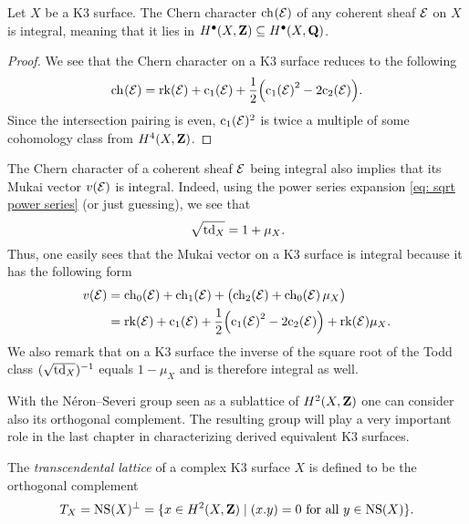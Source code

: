 \begin{corollary}
    Let $X$ be a K3 surface. The Chern character $\ch[](\E)$ of any coherent sheaf $\mathcal E$ on $X$ is integral, meaning that it lies in $H^{\bullet}(X, \mathbf Z) \subseteq H^{\bullet}(X, \mathbf Q)$.
\end{corollary}

\begin{proof}
    We see that the Chern character on a K3 surface reduces to the following
    \[
        \ch[]{\E} = \rk{\E} + \cclass[1]{\E} + \frac{1}{2}\Bigl(\cclass[1]{\E}^2 - 2\cclass[2]{\E}\Bigr).
    \]
    Since the intersection pairing is even, $\cclass[1](\E)^2$ is twice a multiple of some cohomology class from $H^{4}(X, \mathbf Z)$.
\end{proof}

\begin{remark}
    \label{chern character of K3 integral}
The Chern character of a coherent sheaf $\mathcal E$ being integral also implies that its Mukai vector $v(\mathcal E)$ is integral. Indeed, using the power series expansion \eqref{eq: sqrt power series} (or just guessing), we see that 
\[
    \sqrt{\operatorname{td}_{X}} = 1 + \mu_X.
\]
Thus, one easily sees that the Mukai vector on a K3 surface is integral because it has the following form
\begin{align}
    v(\E) &= \ch[0](\E) + \ch[1]{\E} + \bigl(\ch[2]{\E} + \ch[0]{\E}\mu_X\bigr)
    \label{eq: Mukai vector on K3 chern character} \\
    &= \rk{\E} + \cclass[1]{\E} + \frac{1}{2}\Bigl(\cclass[1]{\E}^2 - 2\cclass[2]{\E}\Bigr) + \rk{\E}\mu_X. \notag
\end{align}
We also remark that on a K3 surface the inverse of the square root of the Todd class $(\sqrt{\operatorname{td}_{X}})^{-1}$ equals $1 - \mu_X$ and is therefore integral as well.
\end{remark}

With the Néron--Severi group seen as a sublattice of $H^{2}(X, \mathbf Z)$ one can consider also its orthogonal complement. The resulting group will play a very important role in the last chapter in characterizing derived equivalent K3 surfaces. 

\begin{definition}
    The \emph{transcendental lattice} of a complex K3 surface $X$ is defined to be the orthogonal complement
    \[
        T_{X} = \operatorname{NS}(X)^\perp = \{ x \in H^{2}(X, \mathbf Z) \mid (x.y) = 0 \text{ for all $y \in \operatorname{NS}(X)$}\}.
    \]
\end{definition}

